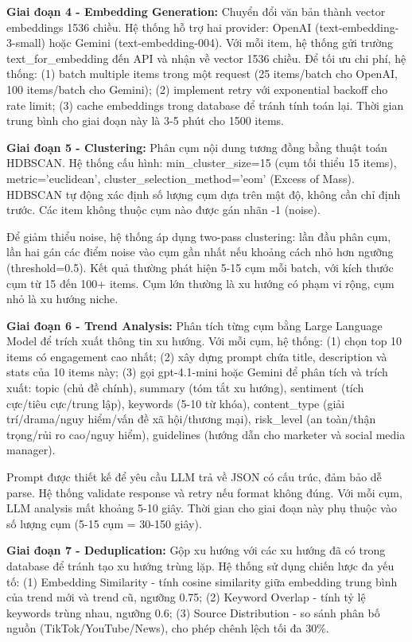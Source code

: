\textbf{Giai đoạn 4 - Embedding Generation:} Chuyển đổi văn bản thành vector embeddings 1536 chiều. Hệ thống hỗ trợ hai provider: OpenAI (text-embedding-3-small) hoặc Gemini (text-embedding-004). Với mỗi item, hệ thống gửi trường text\_for\_embedding đến API và nhận về vector 1536 chiều. Để tối ưu chi phí, hệ thống: (1) batch multiple items trong một request (25 items/batch cho OpenAI, 100 items/batch cho Gemini); (2) implement retry với exponential backoff cho rate limit; (3) cache embeddings trong database để tránh tính toán lại. Thời gian trung bình cho giai đoạn này là 3-5 phút cho 1500 items.

\textbf{Giai đoạn 5 - Clustering:} Phân cụm nội dung tương đồng bằng thuật toán HDBSCAN. Hệ thống cấu hình: min\_cluster\_size=15 (cụm tối thiểu 15 items), metric='euclidean', cluster\_selection\_method='eom' (Excess of Mass). HDBSCAN tự động xác định số lượng cụm dựa trên mật độ, không cần chỉ định trước. Các item không thuộc cụm nào được gán nhãn -1 (noise).

Để giảm thiểu noise, hệ thống áp dụng two-pass clustering: lần đầu phân cụm, lần hai gán các điểm noise vào cụm gần nhất nếu khoảng cách nhỏ hơn ngưỡng (threshold=0.5). Kết quả thường phát hiện 5-15 cụm mỗi batch, với kích thước cụm từ 15 đến 100+ items. Cụm lớn thường là xu hướng có phạm vi rộng, cụm nhỏ là xu hướng niche.

\textbf{Giai đoạn 6 - Trend Analysis:} Phân tích từng cụm bằng Large Language Model để trích xuất thông tin xu hướng. Với mỗi cụm, hệ thống: (1) chọn top 10 items có engagement cao nhất; (2) xây dựng prompt chứa title, description và stats của 10 items này; (3) gọi gpt-4.1-mini hoặc Gemini để phân tích và trích xuất: topic (chủ đề chính), summary (tóm tắt xu hướng), sentiment (tích cực/tiêu cực/trung lập), keywords (5-10 từ khóa), content\_type (giải trí/drama/nguy hiểm/vấn đề xã hội/thương mại), risk\_level (an toàn/thận trọng/rủi ro cao/nguy hiểm), guidelines (hướng dẫn cho marketer và social media manager).

Prompt được thiết kế để yêu cầu LLM trả về JSON có cấu trúc, đảm bảo dễ parse. Hệ thống validate response và retry nếu format không đúng. Với mỗi cụm, LLM analysis mất khoảng 5-10 giây. Thời gian cho giai đoạn này phụ thuộc vào số lượng cụm (5-15 cụm = 30-150 giây).

\textbf{Giai đoạn 7 - Deduplication:} Gộp xu hướng với các xu hướng đã có trong database để tránh tạo xu hướng trùng lặp. Hệ thống sử dụng chiến lược đa yếu tố: (1) Embedding Similarity - tính cosine similarity giữa embedding trung bình của trend mới và trend cũ, ngưỡng 0.75; (2) Keyword Overlap - tính tỷ lệ keywords trùng nhau, ngưỡng 0.6; (3) Source Distribution - so sánh phân bố nguồn (TikTok/YouTube/News), cho phép chênh lệch tối đa 30\%.

